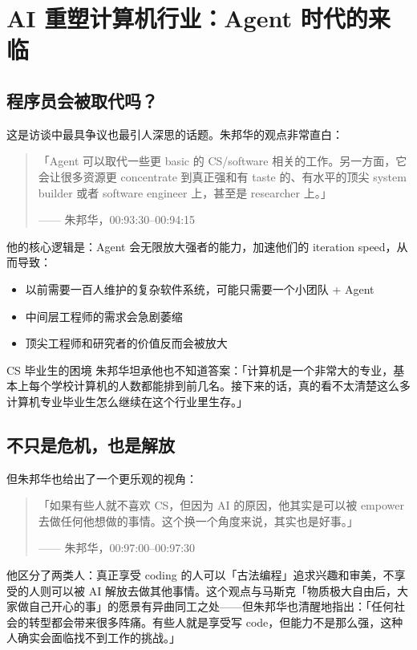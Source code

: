 \documentclass[a4paper]{article}
\begin{document}
\section{AI 重塑计算机行业：Agent 时代的来临}

\subsection{程序员会被取代吗？}

这是访谈中最具争议也最引人深思的话题。朱邦华的观点非常直白：

\begin{quote}
「Agent 可以取代一些更 basic 的 CS/software 相关的工作。另一方面，它会让很多资源更 concentrate 到真正强和有 taste 的、有水平的顶尖 system builder 或者 software engineer 上，甚至是 researcher 上。」\par
\hfill —— 朱邦华，00:93:30--00:94:15
\end{quote}

他的核心逻辑是：Agent 会无限放大强者的能力，加速他们的 iteration speed，从而导致：
\begin{itemize}
\item 以前需要一百人维护的复杂软件系统，可能只需要一个小团队 + Agent
\item 中间层工程师的需求会急剧萎缩
\item 顶尖工程师和研究者的价值反而会被放大
\end{itemize}

\begin{warningbox}{CS 毕业生的困境}
朱邦华坦承他也不知道答案：「计算机是一个非常大的专业，基本上每个学校计算机的人数都能排到前几名。接下来的话，真的看不太清楚这么多计算机专业毕业生怎么继续在这个行业里生存。」
\end{warningbox}

\subsection{不只是危机，也是解放}

但朱邦华也给出了一个更乐观的视角：

\begin{quote}
「如果有些人就不喜欢 CS，但因为 AI 的原因，他其实是可以被 empower 去做任何他想做的事情。这个换一个角度来说，其实也是好事。」\par
\hfill —— 朱邦华，00:97:00--00:97:30
\end{quote}

他区分了两类人：真正享受 coding 的人可以「古法编程」追求兴趣和审美，不享受的人则可以被 AI 解放去做其他事情。这个观点与马斯克「物质极大自由后，大家做自己开心的事」的愿景有异曲同工之处——但朱邦华也清醒地指出：「任何社会的转型都会带来很多阵痛。有些人就是享受写 code，但能力不是那么强，这种人确实会面临找不到工作的挑战。」
\end{document}
